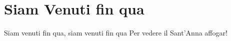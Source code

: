 \section{Siam Venuti fin qua}
\begin{canzone}
Siam venuti fin qua, siam venuti fin qua
Per vedere il Sant'Anna affogar!
\end{canzone}
